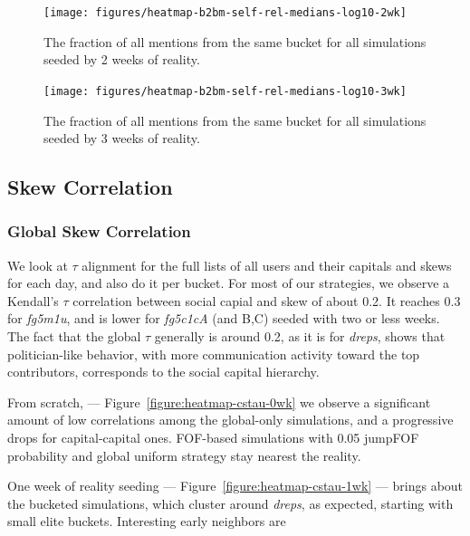\documentclass[10pt,oneside]{memoir}
\begin{document}
\begin{Spacing}{2}
\begin{figure}
\begin{center}
    \texttt{[image: figures/heatmap-b2bm-self-rel-medians-log10-2wk]}
    \caption{The fraction of all mentions from the same bucket for all simulations seeded by 2 weeks of reality.}
    \label{figure:heatmap-b2bm-self-rel-medians-2wk}
\end{center}
\end{figure}

\begin{figure}
\begin{center}
    \texttt{[image: figures/heatmap-b2bm-self-rel-medians-log10-3wk]}
    \caption{The fraction of all mentions from the same bucket for all simulations seeded by 3 weeks of reality.}
    \label{figure:heatmap-b2bm-self-rel-medians-3wk}
\end{center}
\end{figure}
\pagebreak \subsection{Skew Correlation}
\label{skewcorrelation}

\subsubsection{Global Skew Correlation}
\label{globalskewcorrelation}

We look at $\tau$ alignment for the full lists of all users and their capitals and skews for each day, and also do it per bucket. 
For most of our strategies, we observe a Kendall's $\tau$ correlation between social capial and skew of about 0.2.  It reaches 0.3 for {\itshape fg5m1u}, and is lower for {\itshape fg5c1cA} (and B,C) seeded with two or less weeks.
The fact that the global $\tau$ generally is around 0.2, as it is for {\itshape dreps}, shows that politician-like behavior, with more communication activity toward the top contributors, corresponds to the social capital hierarchy.


From scratch, --- Figure~\ref{figure:heatmap-cstau-0wk} we observe a significant amount of low correlations among the global-only simulations, and a progressive drops for capital-capital ones.  FOF-based simulations with 0.05 jumpFOF probability and global uniform strategy stay nearest the reality.


One week of reality seeding --- Figure~\ref{figure:heatmap-cstau-1wk} --- brings about the bucketed simulations, which cluster around {\itshape dreps}, as expected, starting with small elite buckets.  Interesting early neighbors are



\end{Spacing}
\end{document}
